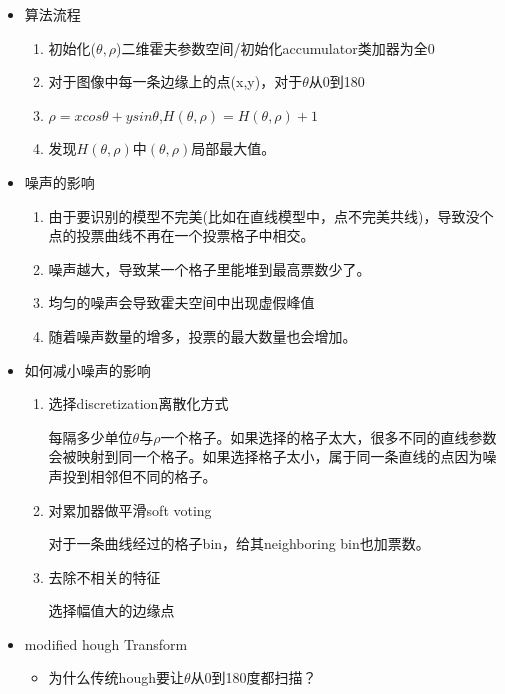 \documentclass[UTF8]{ctexart}
\begin{document}
\begin{itemize}
    \item 算法流程
    \begin{enumerate}
        \item 初始化($\theta,\rho$)二维霍夫参数空间/初始化accumulator类加器为全0
        \item 对于图像中每一条边缘上的点(x,y)，对于$\theta$从0到180
        \item $\rho=xcos\theta+ysin\theta$,$H(\theta,\rho)=H(\theta,\rho)+1$
        \item 发现$H(\theta,\rho)$中$(\theta,\rho)$局部最大值。
    \end{enumerate}

    \item 噪声的影响
    \begin{enumerate}
        \item 由于要识别的模型不完美(比如在直线模型中，点不完美共线)，导致没个点的投票曲线不再在一个投票格子中相交。
        \item 噪声越大，导致某一个格子里能堆到最高票数少了。
        \item 均匀的噪声会导致霍夫空间中出现虚假峰值
        \item 随着噪声数量的增多，投票的最大数量也会增加。
    \end{enumerate}

    \item 如何减小噪声的影响
    \begin{enumerate}
        \item 选择discretization离散化方式
        
        每隔多少单位$\theta \text{与} \rho$一个格子。如果选择的格子太大，很多不同的直线参数会被映射到同一个格子。如果选择格子太小，属于同一条直线的点因为噪声投到相邻但不同的格子。
        \item 对累加器做平滑soft voting
        
        对于一条曲线经过的格子bin，给其neighboring bin也加票数。

        \item 去除不相关的特征
        
        选择幅值大的边缘点

    \end{enumerate}

    \item modified hough Transform
    
    \begin{itemize}
        \item 为什么传统hough要让$\theta$从0到180度都扫描？
        

\end{itemize}
\end{itemize}
\end{document}
